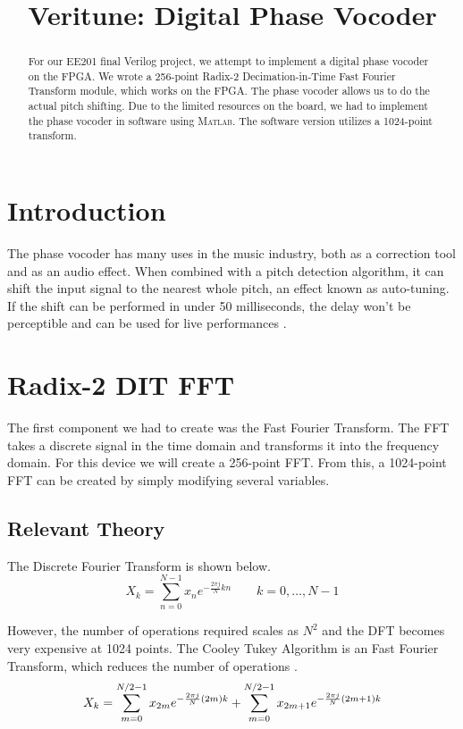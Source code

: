 \documentclass[twoside]{article}
\title{Veritune: Digital Phase Vocoder}
\begin{document}
\maketitle
%
\begin{abstract}
	For our EE201 final Verilog project, we attempt to implement a digital phase vocoder on the FPGA. 
	We wrote a 256-point Radix-2 Decimation-in-Time Fast Fourier Transform module, which works on the FPGA.  
	The phase vocoder allows us to do	the actual pitch shifting. Due to the limited resources on the board,
	we had to implement the phase vocoder in software using \textsc{Matlab}. The software version utilizes a 
	1024-point transform.
\end{abstract}

%
%
%
%
\section{Introduction}
  The phase vocoder has many uses in the music industry, both as a correction tool and as an audio effect.
  When combined with a pitch detection algorithm, it can shift the input signal to the nearest whole pitch, an effect known as auto-tuning.
  If the shift can be performed in under 50 milliseconds, the delay won't be perceptible and can be used for live performances \cite{bib:guitarpitchshifter}.
  

  
%
%
%
%
\section{Radix-2 DIT FFT}
  The first component we had to create was the Fast Fourier Transform. The FFT takes a discrete signal in the time domain and 
  transforms it into the frequency domain. For this device we will create a 256-point FFT.  From this, a 1024-point FFT can be created
  by simply modifying several variables.
  \subsection{Relevant Theory}
  The Discrete Fourier Transform is shown below.
  \begin{equation}
  	X_k = \sum_{n=0}^{N-1} x_n e^{-\frac{2 \pi j}{N} k n} \quad \quad k = 0, \dots, N-1
  	\label{eqn:dft}
  \end{equation}
  
  However, the number of operations required scales as $N^2$ and the DFT becomes very expensive at 1024 points.
  The Cooley Tukey Algorithm is an Fast Fourier Transform, which reduces the number of operations \cite{bib:ctdft}.
  \begin{equation}
  	 X_k  =	 \sum \limits_{m=0}^{N/2-1} x_{2m}     e^{-\frac{2\pi j}{N} (2m)k}\\   +  \sum \limits_{m=0}^{N/2-1} x_{2m+1} e^{-\frac{2\pi j}{N} (2m+1)k}
  	\label{eqn:ctdft}
  \end{equation} 
  
\end{document}
